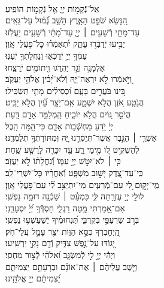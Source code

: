 \documentclass[twoside, openany, parskip=half, 11pt]{book}
\begin{document}
\\
\vspace{-1.5\baselineskip}
\begin{narrow}
%
אֵל־נְֿֿקָמ֥וֹת יְיָ֑ \hfill אֵ֖ל נְֿקָמ֣וֹת הוֹפִֽיעַ׃ \\
הִ֭נָּשֵׂא שֹׁפֵ֣ט הָאָ֑רֶץ \hfill הָשֵׁ֥ב גְּֿ֝מ֗וּל עַל־גֵּאִֽים׃ \\
עַד־מָתַ֖י רְֿשָׁעִ֥ים ׀ יְיָ֑ \hfill עַד־מָ֝תַ֗י רְֿשָׁעִ֥ים יַעֲלֹֽזוּ׃ \\
יַבִּ֣יעוּ יְֿדַבְּֿר֣וּ עָתָ֑ק \hfill יִ֝תְאַמְּֿר֗וּ כׇּל־פֹּ֥עֲלֵי אָֽוֶן׃ \\
עַמְּֿךָ֣ יְיָ֣ יְֿדַכְּֿא֑וּ \hfill וְֽֿנַחֲלָתְֿךָ֥ יְֿעַנּֽוּ׃ \\
אַלְמָנָ֣ה וְֿגֵ֣ר יַהֲרֹ֑גוּ \hfill וִ֖יתוֹמִ֣ים יְֿרַצֵּֽחוּ׃ \\
וַ֭יֹּ֣אמְֿרוּ לֹ֣א יִרְאֶה־יָּ֑הּ \hfill וְֿלֹא־יָ֝בִ֗ין אֱלֹהֵ֥י יַעֲקֹֽב׃ \\
בִּ֭ינוּ בֹּעֲרִ֣ים בָּעָ֑ם \hfill וּ֝כְסִילִ֗ים מָתַ֥י תַּשְׂכִּֽילוּ׃ \\
הֲנֹ֣טַֽע אֹ֭זֶן הֲלֹ֣א יִשְׁמָ֑ע \hfill אִֽם־יֹ֥צֵֽר עַ֗֝יִן הֲלֹ֣א יַבִּֽיט׃ \\
הֲיֹסֵ֣ר גּ֭וֹיִם הֲלֹ֣א יוֹכִ֑יחַ \hfill הַֽמְלַמֵּ֖ד אָדָ֣ם דָּֽעַת׃ \\
יְיָ֗ יֹ֭דֵעַ מַחְשְֿׁב֣וֹת אָדָ֑ם \hfill כִּי־הֵ֥מָּה הָֽבֶל׃ \\
אַשְׁרֵ֤י ׀ הַגֶּ֣בֶר אֲשֶׁר־תְּֿיַסְּֿרֶ֣נּוּ יָּ֑הּ \hfill וּֽמִתּוֹרָתְֿךָ֥ תְֿלַמְּֿדֶֽנּוּ׃ \\
לְֿהַשְׁקִ֣יט ל֭וֹ מִ֣ימֵי רָ֑ע \hfill עַ֤ד יִכָּרֶ֖ה לָרָשָׁ֣ע שָֽׁחַת׃ \\
כִּ֤י ׀ לֹא־יִטֹּ֣שׁ יְיָ֣ עַמּ֑וֹ \hfill וְֿ֝נַחֲלָת֗וֹ לֹ֣א יַעֲזֹֽב׃ \\
כִּֽי־עַד־צֶ֭דֶק יָשׁ֣וּב מִשְׁפָּ֑ט \hfill וְֿ֝אַחֲרָ֗יו כׇּל־יִשְׁרֵי־לֵֽב׃ \\
מִֽי־יָק֣וּם לִ֭י עִם־מְֿרֵעִ֑ים \hfill מִי־יִתְיַצֵּ֥ב לִ֗֝י עִם־פֹּ֥עֲלֵי אָֽוֶן׃ \\
לוּלֵ֣י יְיָ֭ עֶזְרָ֣תָה לִּ֑י \hfill כִּמְעַ֓ט ׀ שָׁכְֿנָ֖ה דוּמָ֣ה נַפְשִֽׁי׃ \\
אִם־אָ֭מַרְתִּי מָ֣טָה רַגְלִ֑י \hfill חַסְדְּֿֿךָ֥ יְ֝יָ֗ יִסְעָדֵֽנִי׃ \\
בְּֿרֹ֣ב שַׂרְעַפַּ֣י בְּֿקִרְבִּ֑י \hfill תַּ֝נְחוּמֶ֗יךָ יְֽֿשַׁעַשְׁע֥וּ נַפְשִֽׁי׃ \\
הַֽ֭יְחׇבְרְֿךָ כִּסֵּ֣א הַוּ֑וֹת \hfill יֹצֵ֖ר עָמָ֣ל עֲלֵי־חֹֽק׃ \\
יָ֭גוֹדּוּ עַל־נֶ֣פֶשׁ צַדִּ֑יק \hfill וְֿדָ֖ם נָקִ֣י יַרְשִֽׁיעוּ׃ \\
וַיְהִ֬י יְיָ֣ לִ֣י לְֿמִשְׂגָּ֑ב \hfill וֵ֝אלֹהַ֗י לְֿצ֣וּר מַחְסִֽי׃ \\
וַיָּ֤שֶׁב עֲלֵיהֶ֨ם ׀ אֶת־אוֹנָ֗ם \hfill וּבְרָעָתָ֥ם יַצְמִיתֵ֑ם\\ יַ֝צְמִיתֵ֗ם יְיָ֥ אֱלֹהֵֽינוּ׃ \hfill \break
\end{narrow}
\end{document}
